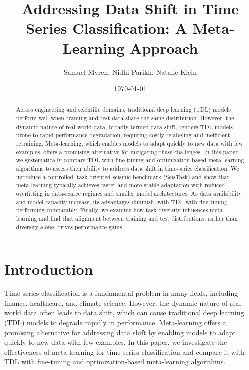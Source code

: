 \documentclass{article}
\begin{document}
\title{Addressing Data Shift in Time Series Classification: A Meta-Learning Approach}
\author{Samuel Myren, Nidhi Parikh, Natalie Klein}
\date{\today}

\maketitle

\begin{abstract}
Across engineering and scientific domains, traditional deep learning (TDL) models perform well when training and test data share the same distribution. However, the dynamic nature of real-world data, broadly termed data shift, renders TDL models prone to rapid performance degradation, requiring costly relabeling and inefficient retraining. Meta-learning, which enables models to adapt quickly to new data with few examples, offers a promising alternative for mitigating these challenges. In this paper, we systematically compare TDL with fine-tuning and optimization-based meta-learning algorithms to assess their ability to address data shift in time-series classification. We introduce a controlled, task-oriented seismic benchmark (SeisTask) and show that meta-learning typically achieves faster and more stable adaptation with reduced overfitting in data-scarce regimes and smaller model architectures. As data availability and model capacity increase, its advantages diminish, with TDL with fine-tuning performing comparably. Finally, we examine how task diversity influences meta-learning and find that alignment between training and test distributions, rather than diversity alone, drives performance gains.
\end{abstract}

\section{Introduction}
Time series classification is a fundamental problem in many fields, including finance, healthcare, and climate science. However, the dynamic nature of real-world data often leads to data shift, which can cause traditional deep learning (TDL) models to degrade rapidly in performance. Meta-learning offers a promising alternative for addressing data shift by enabling models to adapt quickly to new data with few examples. In this paper, we investigate the effectiveness of meta-learning for time-series classification and compare it with TDL with fine-tuning and optimization-based meta-learning algorithms.
\end{document}
